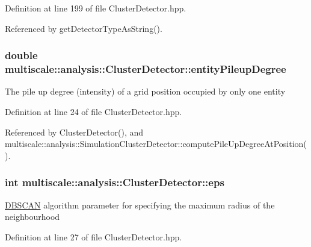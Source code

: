\-Definition at line 199 of file \-Cluster\-Detector.\-hpp.



\-Referenced by get\-Detector\-Type\-As\-String().

\hypertarget{classmultiscale_1_1analysis_1_1ClusterDetector_aaa93a4b3a5a3c4279aa434669093ac40}{
\subsubsection[{entity\-Pileup\-Degree}]{\setlength{\rightskip}{0pt plus 5cm}double {\bf multiscale\-::analysis\-::\-Cluster\-Detector\-::entity\-Pileup\-Degree}}}\label{classmultiscale_1_1analysis_1_1ClusterDetector_aaa93a4b3a5a3c4279aa434669093ac40}
\-The pile up degree (intensity) of a grid position occupied by only one entity 

\-Definition at line 24 of file \-Cluster\-Detector.\-hpp.



\-Referenced by \-Cluster\-Detector(), and multiscale\-::analysis\-::\-Simulation\-Cluster\-Detector\-::compute\-Pile\-Up\-Degree\-At\-Position().

\hypertarget{classmultiscale_1_1analysis_1_1ClusterDetector_a61e876f87d62245eada8f56d587d39cd}{
\subsubsection[{eps}]{\setlength{\rightskip}{0pt plus 5cm}int {\bf multiscale\-::analysis\-::\-Cluster\-Detector\-::eps}}}\label{classmultiscale_1_1analysis_1_1ClusterDetector_a61e876f87d62245eada8f56d587d39cd}
\hyperlink{classmultiscale_1_1analysis_1_1DBSCAN}{\-D\-B\-S\-C\-A\-N} algorithm parameter for specifying the maximum radius of the neighbourhood 

\-Definition at line 27 of file \-Cluster\-Detector.\-hpp.



